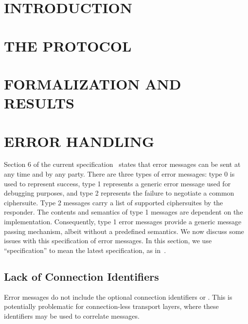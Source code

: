 \documentclass[runningheads]{llncs}
\begin{document}
\section{\uppercase{Introduction}}
\label{sec:introduction}


\section{\uppercase{The \mEdhoc{} Protocol}}
\label{sec:edhoc}


\section{\uppercase{Formalization and Results}}
\label{sec:formalization}


\section{\uppercase{Error Handling}}
\label{sec:errorHandling}
Section 6 of the current \mEdhoc{}
specification~\cite{draft-ietf-lake-edhoc-15}
states that error messages can be sent at any time and by any party.
%
There are three types of error messages: type 0 is used to represent success,
type 1 represents a generic error message used for debugging purposes, and
type 2 represents the failure to negotiate a common ciphersuite.
%
Type 2 messages carry a list of supported ciphersuites by the responder.
%
The contents and semantics of type 1 messages are dependent on the
implementation.
%
Consequently, type 1 error messages provide a generic message passing
mechanism, albeit without a predefined semantics.
%
We now discuss some issues with this specification of error messages.
%
In this section, we use ``specification'' to mean the latest specification, as
in~\cite{draft-ietf-lake-edhoc-15}.

\subsection{Lack of Connection Identifiers}
Error messages do not include the optional connection identifiers \mCi{} or
\mCr{}.
%
This is potentially problematic for connection-less transport layers, where
these identifiers may be used to correlate messages.
\end{document}
